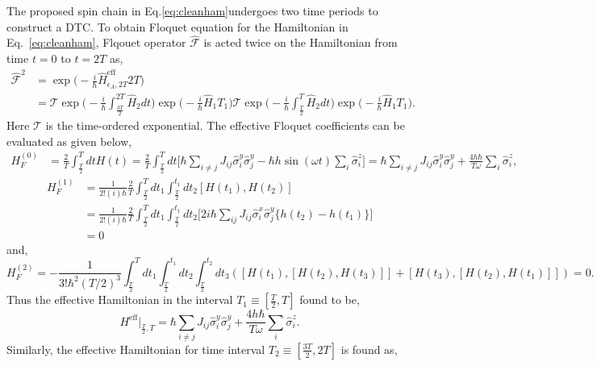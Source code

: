 \documentclass[%
nofootinbib,
reprint,
superscriptaddress,
amsmath,amssymb,showkeys,
aps,
prb,
]{revtex4-2}
\begin{document}
	The proposed spin chain in Eq.\eqref{eq:cleanham}undergoes two time periods to construct a DTC. To obtain Floquet equation for the Hamiltonian in Eq.~\ref{eq:cleanham}, Flqouet operator $\hat{\mathcal{F}}$ is acted twice on the Hamiltonian from time $t=0$ to $t=2T$ as,
	\begin{align*}
		\hat{\mathcal{F}}^2 &= \exp\Big(-\frac{i}{\hbar}\hat{H}_{\epsilon_A, 2T}^{\mathrm{eff}}2T\Big)\\ 
		&= \mathcal{T}\exp\Big(-\frac{i}{\hbar}\int_{\frac{3T}{2}}^{2T}\hat{H}_2 dt\Big)
		\exp\Big(-\frac{i}{\hbar}\hat{H}_1T_1\Big)\mathcal{T}\exp\Big(-\frac{i}{\hbar}\int_{\frac{T}{2}}^{T}\hat{H}_2 dt\Big)\exp\Big(-\frac{i}{\hbar}\hat{H}_1T_1\Big).
		\label{}
	\end{align*}
	Here $\mathcal{T}$ is the time-ordered exponential. The effective Floquet coefficients can be evaluated as given below,	
	\begin{align}
		H_F^{(0)} &= \frac{2}{T} \int_{\frac{T}{2}}^{T} dt H(t) = \frac{2}{T} \int_{\frac{T}{2}}^{T} dt \Bigg[\hbar\sum_{i\neq j} J_{ij} \hat{\sigma}^y_i \hat{\sigma}^y_j -\hbar h\sin(\omega t) \sum_i\hat{\sigma}^z_i\Bigg]= \hbar\sum_{i\neq j} J_{ij} \hat{\sigma}^y_i \hat{\sigma}^y_j + \frac{4h\hbar}{T \omega}\sum_i\hat{\sigma}^z_i,
	\end{align}	
	\begin{align}
		H_F^{(1)} &= \frac{1}{2!(i)\hbar} \frac{2}{T} \int_{\frac{T}{2}}^{T} dt_1  \int_{\frac{T}{2}}^{t_1} dt_2 [H(t_1), H(t_2)]\nonumber\\
		&= \frac{1}{2!(i)\hbar} \frac{2}{T}\int_{\frac{T}{2}}^{T} dt_1 \int_{\frac{T}{2}}^{t_1} dt_2\Bigg[2i\hbar\sum_{ij}^{}J_{ij}\hat{\sigma}^x_i\hat{\sigma}^y_j\Big\{h(t_2) -h(t_1)\Big\}\Bigg]\nonumber\\
		&= 0
	\end{align}	
	and,
	\begin{equation}
		H_F^{(2)} = -\frac{1}{3!\hbar^2 (T/2)^3} \int_{\frac{T}{2}}^{T} dt_1  \int_{{\frac{T}{2}}}^{t_1} dt_2 \int_{\frac{T}{2}}^{t_2} dt_3([H(t_1),[H(t_2), H(t_3)]] + [H(t_3),[H(t_2), H(t_1)]])= 0.    
	\end{equation}
	Thus the effective Hamiltonian in the interval $T_1\equiv[\frac{T}{2}, T]$ found to be,	
	\begin{equation}
		H^{\mathrm{eff}}\vert_{\frac{T}{2}, T} =  \hbar\sum_{i\neq j} J_{ij} \hat{\sigma}^y_i \hat{\sigma}^y_{j} + \frac{4h\hbar}{T \omega}\sum_i\hat{\sigma}^z_i.
	\end{equation} 	
	Similarly, the effective Hamiltonian for time interval $T_2\equiv[\frac{3T}{2}, 2T]$ is found as,	
\end{document}
